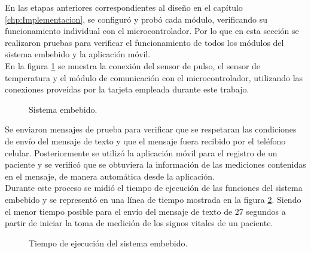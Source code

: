 En las etapas anteriores correspondientes al diseño en el capítulo \ref{chp:Implementacion}, se configuró y probó cada módulo, verificando su funcionamiento individual con el microcontrolador. Por lo que en esta sección se realizaron pruebas para verificar el funcionamiento de todos los módulos del sistema embebido y la aplicación móvil. \\

En la figura \ref{fig:integracion} se muestra la conexión del sensor de pulso, el sensor de temperatura y el módulo de comunicación con el microcontrolador, utilizando las conexiones proveídas por la tarjeta empleada durante este trabajo. \\

\begin{figure}[htbp!]
	\centering
	\caption{Sistema embebido.}
	\label{fig:integracion}
\end{figure}

Se enviaron mensajes de prueba para verificar que se respetaran las condiciones de envío del mensaje de texto y que el mensaje fuera recibido por el teléfono celular. Posteriormente se utilizó la aplicación móvil para el registro de un paciente y se verificó que se obtuviera la información de las mediciones contenidas en el mensaje, de manera automática desde la aplicación. \\

Durante este proceso se midió el tiempo de ejecución de las funciones del sistema embebido y se representó en una línea de tiempo mostrada en la figura \ref{fig:tiempoSistemaEmbebido}. Siendo el menor tiempo posible para el envío del mensaje de texto de 27 segundos a partir de iniciar la toma de medición de los signos vitales de un paciente.

\begin{figure}[htbp!]
	\centering
	\caption{Tiempo de ejecución del sistema embebido.}
	\label{fig:tiempoSistemaEmbebido}
\end{figure}
